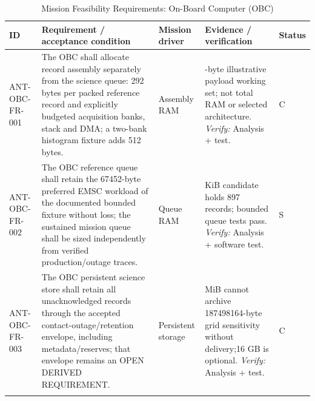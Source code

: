 \begin{table}[H]\centering\small\setlength{\tabcolsep}{3pt}
\caption{Mission Feasibility Requirements: On-Board Computer (OBC)}\label{tab:fr-obc}
\begin{tabular}{@{}
>{\RaggedRight\arraybackslash}p{}
>{\RaggedRight\arraybackslash}p{}
>{\RaggedRight\arraybackslash}p{}
>{\RaggedRight\arraybackslash}p{}
>{\RaggedRight\arraybackslash}p{}
@{}}
\toprule ID & Requirement / acceptance condition & Mission driver & Evidence / verification & Status\\\midrule
{}\label{req:ANT-OBC-FR-001}\mbox{ANT-OBC-}\newline\mbox{FR-001} & The OBC shall allocate record assembly separately from the science queue: 292 bytes per packed reference record and explicitly budgeted acquisition banks, stack and DMA; a two-bank histogram fixture adds 512 bytes. & Assembly RAM & 804-byte illustrative payload working set; not total RAM or selected architecture. \emph{Verify:} Analysis + test. & C\\
\addlinespace[3pt]
\label{req:ANT-OBC-FR-002}\mbox{ANT-OBC-}\newline\mbox{FR-002} & The OBC reference queue shall retain the 67452-byte preferred EMSC workload of the documented bounded fixture without loss; the sustained mission queue shall be sized independently from verified production/outage traces. & Queue RAM & 256 KiB candidate holds 897 records; bounded queue tests pass. \emph{Verify:} Analysis + software test. & S\\
\addlinespace[3pt]
\label{req:ANT-OBC-FR-003}\mbox{ANT-OBC-}\newline\mbox{FR-003} & The OBC persistent science store shall retain all unacknowledged records through the accepted contact-outage/retention envelope, including metadata/reserves; that envelope remains an OPEN DERIVED REQUIREMENT. & Persistent storage & 128 MiB cannot archive 187498164-byte grid sensitivity without delivery;16 GB is optional. \emph{Verify:} Analysis + test. & C\\
\addlinespace[3pt]
\bottomrule
\end{tabular}
\end{table}
